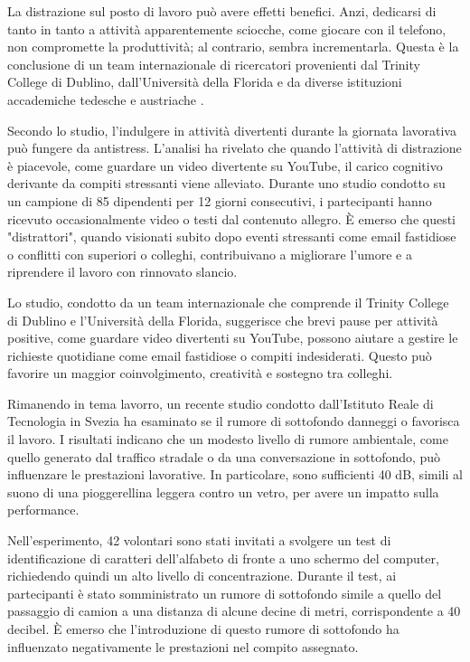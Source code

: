 \documentclass[12pt]{book} %
\begin{document}
\begin{mdframed}[linewidth=1pt]
La distrazione sul posto di lavoro può avere effetti benefici. Anzi, dedicarsi di tanto in tanto a attività apparentemente sciocche, come giocare con il telefono, non compromette la produttività; al contrario, sembra incrementarla. Questa è la conclusione di un team internazionale di ricercatori provenienti dal Trinity College di Dublino, dall'Università della Florida e da diverse istituzioni accademiche tedesche e austriache .

Secondo lo studio, l'indulgere in attività divertenti durante la giornata lavorativa può fungere da antistress. L'analisi ha rivelato che quando l'attività di distrazione è piacevole, come guardare un video divertente su YouTube, il carico cognitivo derivante da compiti stressanti viene alleviato. Durante uno studio condotto su un campione di 85 dipendenti per 12 giorni consecutivi, i partecipanti hanno ricevuto occasionalmente video o testi dal contenuto allegro. È emerso che questi "distrattori", quando visionati subito dopo eventi stressanti come email fastidiose o conflitti con superiori o colleghi, contribuivano a migliorare l'umore e a riprendere il lavoro con rinnovato slancio.

Lo studio, condotto da un team internazionale che comprende il Trinity College di Dublino e l'Università della Florida, suggerisce che brevi pause per attività positive, come guardare video divertenti su YouTube, possono aiutare a gestire le richieste quotidiane come email fastidiose o compiti indesiderati. Questo può favorire un maggior coinvolgimento, creatività e sostegno tra colleghi.

Rimanendo in tema lavorro, un recente studio condotto dall'Istituto Reale di Tecnologia in Svezia ha esaminato se il rumore di sottofondo danneggi o favorisca il lavoro. I risultati indicano che un modesto livello di rumore ambientale, come quello generato dal traffico stradale o da una conversazione in sottofondo, può influenzare le prestazioni lavorative. In particolare, sono sufficienti 40 dB, simili al suono di una pioggerellina leggera contro un vetro, per avere un impatto sulla performance.

Nell'esperimento, 42 volontari sono stati invitati a svolgere un test di identificazione di caratteri dell'alfabeto di fronte a uno schermo del computer, richiedendo quindi un alto livello di concentrazione. Durante il test, ai partecipanti è stato somministrato un rumore di sottofondo simile a quello del passaggio di camion a una distanza di alcune decine di metri, corrispondente a 40 decibel. È emerso che l'introduzione di questo rumore di sottofondo ha influenzato negativamente le prestazioni nel compito assegnato.
\end{mdframed}
\end{document}
